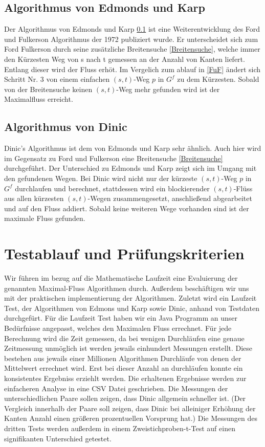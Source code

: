\documentclass[a4paper]{llncs}
\begin{document}
\subsection{Algorithmus von Edmonds und Karp}
\label{EuK}
Der Algorithmus von Edmonds und Karp \ref{EuK} ist eine Weiterentwicklung des Ford und Fulkerson Algorithmus der 1972 publiziert wurde.
Er unterscheidet sich zum Ford Fulkerson durch seine zusätzliche Breitensuche \ref{Breitensuche},
welche immer den Kürzesten Weg von s nach t gemessen an der Anzahl von Kanten liefert. 
Entlang dieser wird der Fluss erhöt.
Im Vergelich zum ablauf in \ref{FuF} ändert sich Schritt Nr. 3 von einem einfachen $(s, t)$-Weg $p$ in $G^{f}$ zu dem Kürzesten.
Sobald von der Breitensuche keinen $(s,t)$-Weg mehr gefunden wird ist der Maximalfluss erreicht. 

\subsection{Algorithmus von Dinic}
\label{Dinic}
Dinic's Algorithmus ist dem von Edmonds und Karp sehr ähnlich. Auch hier wird im Gegensatz zu Ford und Fulkerson eine Breitensuche \ref{Breitensuche} durchgeführt. Der Unterschied zu Edmonds und Karp zeigt sich im Umgang mit den gefundenen Wegen. Bei Dinic wird nicht nur der kürzeste $(s, t)$-Weg $p$ in $G^{f}$ durchlaufen und berechnet, stattdessen wird ein blockierender $(s, t)$-Flüss aus allen kürzesten $(s, t)$-Wegen zusammengesetzt, anschließend abgearbeitet und auf den Fluss addiert. Sobald keine weiteren Wege vorhanden sind ist der maximale Fluss gefunden.

\section{Testablauf und Prüfungskriterien}
\label{Inhalt}
Wir führen im bezug auf die Mathematische Laufzeit eine Evaluierung der genannten Maximal-Fluss Algorithmen durch. Außerdem beschäftigen wir uns mit der praktischen implementierung der Algorithmen. Zuletzt wird ein Laufzeit Test, der Algorithmen von Edmons und Karp sowie Dinic, anhand von Testdaten durchgefürt.
Für die Laufzeit Test haben wir ein Java Programm an unser Bedürfnisse angepasst, welches den Maximalen Fluss errechnet. 
Für jede Berechnung wird die Zeit gemessen, da bei wenigen Durchläufen eine genaue Zeitmessung unmöglich ist werden jewails einhundert Messungen erstellt. Diese bestehen aus jewails einer Millionen Algorithmen Durchläufe von denen der Mittelwert errechnet wird.
Erst bei dieser Anzahl an durchläufen konnte ein konsistentes Ergebniss erziehlt werden.
Die erhaltenen Ergebnisse werden zur einfacheren Analyse in eine CSV Datei geschrieben.
Die Messungen der unterschiedlichen Paare sollen zeigen, dass Dinic allgemein schneller ist.
(Der Vergleich innerhalb der Paare soll zeigen, dass Dinic bei alleiniger Erhöhung der Kanten Anzahl einen größeren prozentuellen Vorsprung hat.)
Die Messungen des dritten Tests werden außerdem in einem Zweistichproben-t-Test auf einen signifikanten Unterschied getestet. 
\end{document}
